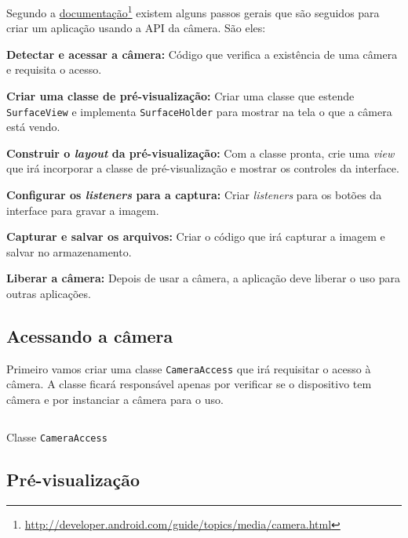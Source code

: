 \documentclass[a4paper,12pt,brazil,oneside]{book}
\begin{document}
		Segundo a \href{http://developer.android.com/guide/topics/media/camera.html}{documentação}\footnote{\href{http://developer.android.com/guide/topics/media/camera.html}{http://developer.android.com/guide/topics/media/camera.html}} existem alguns passos gerais que são seguidos para criar um aplicação usando a API da câmera. São eles:
		\bi
			\item \textbf{Detectar e acessar a câmera:} Código que verifica a existência de uma câmera e requisita o acesso.
			\item \textbf{Criar uma classe de pré-visualização:} Criar uma classe que estende \texttt{SurfaceView} e implementa \texttt{SurfaceHolder} para mostrar na tela o que a câmera está vendo.
			\item \textbf{Construir o \emph{layout} da pré-visualização:} Com a classe pronta, crie uma \emph{view} que irá incorporar a classe de pré-visualização e mostrar os controles da interface.
			\item \textbf{Configurar os \emph{listeners} para a captura:} Criar \emph{listeners} para os botões da interface para gravar a imagem.
			\item \textbf{Capturar e salvar os arquivos:} Criar o código que irá capturar a imagem e salvar no armazenamento.
			\item \textbf{Liberar a câmera:} Depois de usar a câmera, a aplicação deve liberar o uso para outras aplicações. 
		\ei

		\subsection{Acessando a câmera}

		Primeiro vamos criar uma classe \texttt{CameraAccess} que irá requisitar o acesso à câmera. 
		A classe ficará responsável apenas por verificar se o dispositivo tem câmera e por instanciar a câmera para o uso. 

		\begin{listing}[H]
		\inputminted[linenos=true,fontsize=\small,frame=lines, framesep=2mm, tabsize=2,numbersep=5pt]{java}{src/api/camera/camera-access.java}
		\caption{Classe \texttt{CameraAccess}}
		\label{code:camera-access}
		\end{listing} 	

		\subsection{Pré-visualização}
\end{document}
